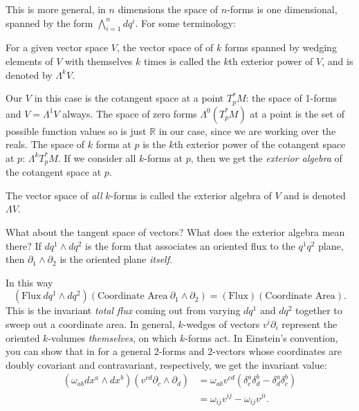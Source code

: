 	This is more general, in $n$ dimensions the space of $n$-forms is one dimensional, spanned by the form $\bigwedge_{i=1}^n dq^i$. For some terminology:
	\begin{defn} For a given vector space $V$, the vector space of of $k$ forms spanned by wedging elements of $V$ with themselves $k$ times is called the $k$th exterior power of $V$, and is denoted by $\Lambda^kV$.
	\end{defn}
	Our $V$ in this case is the cotangent space at a point $T^*_p M$: the space of 1-forms and $V = \Lambda^1 V$ always. The space of zero forms $\Lambda^0 (T^*_p M)$ at a point is the set of possible function values so is just $\mathbb R$ in our case, since we are working over the reals. The space of $k$ forms at $p$ is the $k$th exterior power of the cotangent space at $p$: $\Lambda^k T^*_p M$. If we consider all $k$-forms at $p$, then we get the \emph{exterior algebra} of the cotangent space at $p$. 
	\begin{defn}
		The vector space of \emph{all} $k$-forms is called the exterior algebra of $V$ and is denoted $\Lambda V$.
	\end{defn}
	What about the tangent space of vectors? What does the exterior algebra mean there? If $dq^1 \wedge dq^2$ is the form that associates an oriented flux to the $q^1 q^2$ plane, then $\partial_1 \wedge \partial_2$ is the oriented plane \emph{itself}.
	
	In this way 
	\begin{equation*}
		(\text{Flux} ~ dq^1 \wedge dq^2)(\text{Coordinate Area} ~ \partial_1 \wedge \partial_2) = (\text{Flux}) (\text{Coordinate Area}).
	\end{equation*} 
	This is the invariant \emph{total flux} coming out from varying $dq^1$ and $dq^2$ together to sweep out a coordinate area. In general, $k$-wedges of vectors $v^i \partial_i$ represent the oriented $k$-volumes \emph{themselves}, on which $k$-forms act. In Einstein's convention, you can show that in for a general 2-forms and 2-vectors whose coordinates are doubly covariant and contravariant, respectively, we get the invariant value:
	\begin{align*}
		(\omega_{ab} dx^a \wedge dx^b) (v^{cd} \partial_c \wedge \partial_d) &= \omega_{ab} v^{cd} (\delta^{a}_c \delta^{b}_d - \delta^{a}_d \delta^{b}_c)\\
		& = \omega_{ij}v^{ij} - \omega_{ij}v^{ji}.
	\end{align*}
	
